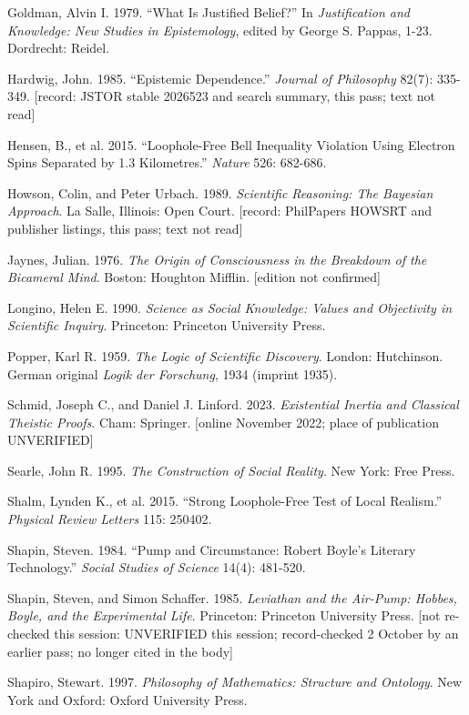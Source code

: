 \documentclass[11pt]{article}
\begin{document}
Goldman, Alvin I. 1979. ``What Is Justified Belief?'' In \emph{Justification and Knowledge: New Studies in Epistemology}, edited by George S. Pappas, 1-23. Dordrecht: Reidel.

Hardwig, John. 1985. ``Epistemic Dependence.'' \emph{Journal of Philosophy} 82(7): 335-349. [record: JSTOR stable 2026523 and search summary, this pass; text not read]

Hensen, B., et al. 2015. ``Loophole-Free Bell Inequality Violation Using Electron Spins Separated by 1.3 Kilometres.'' \emph{Nature} 526: 682-686.

Howson, Colin, and Peter Urbach. 1989. \emph{Scientific Reasoning: The Bayesian Approach}. La Salle, Illinois: Open Court. [record: PhilPapers HOWSRT and publisher listings, this pass; text not read]

Jaynes, Julian. 1976. \emph{The Origin of Consciousness in the Breakdown of the Bicameral Mind}. Boston: Houghton Mifflin. [edition not confirmed]

Longino, Helen E. 1990. \emph{Science as Social Knowledge: Values and Objectivity in Scientific Inquiry}. Princeton: Princeton University Press.

Popper, Karl R. 1959. \emph{The Logic of Scientific Discovery}. London: Hutchinson. German original \emph{Logik der Forschung}, 1934 (imprint 1935).

Schmid, Joseph C., and Daniel J. Linford. 2023. \emph{Existential Inertia and Classical Theistic Proofs}. Cham: Springer. [online November 2022; place of publication UNVERIFIED]

Searle, John R. 1995. \emph{The Construction of Social Reality}. New York: Free Press.

Shalm, Lynden K., et al. 2015. ``Strong Loophole-Free Test of Local Realism.'' \emph{Physical Review Letters} 115: 250402.

Shapin, Steven. 1984. ``Pump and Circumstance: Robert Boyle's Literary Technology.'' \emph{Social Studies of Science} 14(4): 481-520.

Shapin, Steven, and Simon Schaffer. 1985. \emph{Leviathan and the Air-Pump: Hobbes, Boyle, and the Experimental Life}. Princeton: Princeton University Press. [not re-checked this session: UNVERIFIED this session; record-checked 2 October by an earlier pass; no longer cited in the body]

Shapiro, Stewart. 1997. \emph{Philosophy of Mathematics: Structure and Ontology}. New York and Oxford: Oxford University Press.
\end{document}
